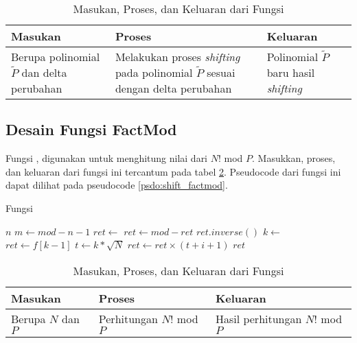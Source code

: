\begin{table}[]	
	\Centering
	\begin{tabular}{|p{3cm}|p{3cm}|p{3cm}|}
	\hline
	Masukan & Proses & Keluaran \\ \hline
	Berupa polinomial $ \tilde{P} $ dan delta perubahan & Melakukan proses \textit{shifting} pada polinomial $ \tilde{P} $ sesuai dengan delta perubahan & Polinomial $ \tilde{P} $ baru hasil \textit{shifting} \\ \hline
	\end{tabular}
	\caption{Masukan, Proses, dan Keluaran dari Fungsi }
	\label{tab:shift_solve_grid}
\end{table}

\subsection{Desain Fungsi FactMod}
Fungsi , digunakan untuk menghitung nilai dari $ N! $ mod $ P $. Masukkan, proses, dan keluaran dari fungsi ini tercantum pada tabel \ref{tab:shift_factmod}. Pseudocode dari fungsi ini dapat dilihat pada pseudocode \ref{psdo:shift_factmod}.

\begin{algorithm}
	\caption{Fungsi }
	\label{psdo:shift_factmod}
	\begin{algorithmic}[1]
		\Require $ n $
			\State $ m \leftarrow mod - n - 1 $
			\State $ ret \leftarrow $ 
				\State $ ret \leftarrow mod - ret$
			\EndIf
			\State \Return $ ret.inverse() $
		\EndIf
		\State $ k \leftarrow $ 
		\State $ ret \leftarrow f[k-1] $
		\State $ t \leftarrow k * \sqrt{N} $
			\State $ ret \leftarrow ret \times (t + i + 1)$
		\EndFor
		\State \Return $ret$
	\end{algorithmic}
\end{algorithm}

\begin{table}[]	
	\Centering
	\begin{tabular}{|p{3cm}|p{3cm}|p{3cm}|}
	\hline
	Masukan & Proses & Keluaran \\ \hline
	Berupa $N$ dan $P$ & Perhitungan $ N! $ mod $P$ & Hasil perhitungan $ N! $ mod $P$ \\ \hline
	\end{tabular}
	\caption{Masukan, Proses, dan Keluaran dari Fungsi }
	\label{tab:shift_factmod}
\end{table}

